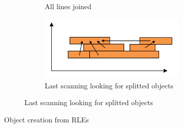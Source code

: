 \begin{figure}
\begin{subfigure}{\linewidth}
\begin{subfigure}{0.4\linewidth}
   			\caption{All lines joined}
   			\label{fig:RLE3}
   		\end{subfigure}
   		\begin{subfigure}{0.4\linewidth}
   			\includegraphics[width=\linewidth]{../Images/c2/RLE4}
   			\caption{Last scanning looking for splitted objects}
   			\label{fig:RLE4}
   		\end{subfigure}
	\end{subfigure}
	\caption{Object creation  from RLEs}
\end{figure}
